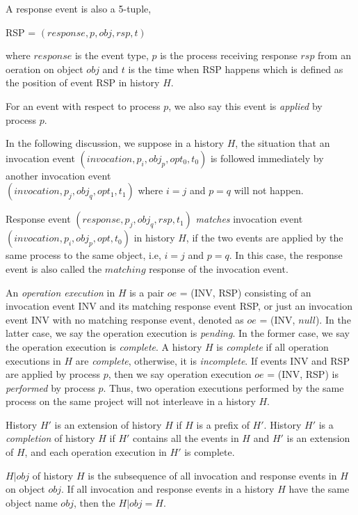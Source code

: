 A response event is also a 5-tuple,
\begin{center}
RSP = $(response, p, obj, rsp, t)$
\end{center}
where $response$ is the event type, $p$ is the process receiving response $rsp$ from an oeration on object $obj$ and $t$
is the time when RSP happens which is defined as the position of event RSP in history $H$.

For an event with respect to
process $p$, we also say this event is \emph{applied} by process $p$.

In the following discussion, we suppose in a history $H$, the situation that an invocation event
$(invocation, p_i, obj_p, opt_0, t_0)$ is followed immediately by another invocation event\\
$(invocation, p_j, obj_q, opt_1, t_1)$ where $i = j$ and $p = q$ will not happen.

Response event $(response, p_j, obj_q, rsp, t_1)$ \emph{matches} invocation event $(invocation, p_i, obj_p, opt, t_0)$
in history $H$, if the two events are applied by the same process to the same object, i.e, $i = j$ and $p = q$.
In this case, the response event is also called the $matching$ response of the invocation event.

An \emph{operation execution} in $H$ is a pair $oe$ = (INV, RSP) consisting of an invocation event INV
and its matching response event RSP, or just an invocation event INV with no matching response event,
denoted as $oe$ = (INV, $null$).
In the latter case, we say the operation execution is \emph{pending}. In the former case, we say the operation
execution is \emph{complete}. A history $H$ is \emph{complete} if all operation executions in $H$ are \emph{complete},
otherwise, it is \emph{incomplete}. If events INV and RSP are applied by process $p$, then we say
operation execution $oe$ = (INV, RSP) is \emph{performed} by process $p$. Thus, two operation
executions performed by the same process on the same project will not interleave in a history $H$.

History $H'$ is an extension of history $H$ if $H$ is a prefix of $H'$.
History $H'$ is a \emph{completion} of history $H$ if $H'$ contains all the
events in $H$ and $H'$ is an extension of $H$, and each operation execution in $H'$ is complete.

$H|obj$ of history $H$ is the subsequence of all
invocation and response events in $H$ on object $obj$. If all invocation and response
events in a history $H$ have the same object name $obj$, then the $H|obj = H$.


